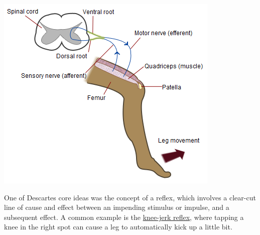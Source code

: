 \documentclass[
  oneside,
  12pt]{crumpbook}
\newenvironment{floatright25}{%
  \wrapfigure{R}{.25\textwidth}%
  }{%
  \endwrapfigure}
\begin{document}
\begin{floatright25}
\includegraphics[width=1\linewidth]{imgs/Patellar-knee-reflex}

\end{floatright25}

One of Descartes core ideas was the concept of a reflex, which involves a clear-cut line of cause and effect between an impending stimulus or impulse, and a subsequent effect. A common example is the \href{https://en.wikipedia.org/wiki/Patellar_reflex}{knee-jerk reflex}, where tapping a knee in the right spot can cause a leg to automatically kick up a little bit.
\end{document}
